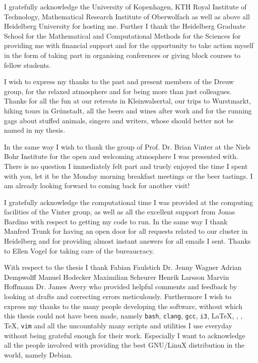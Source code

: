 
I gratefully acknowledge
the University of Kopenhagen,
KTH Royal Institute of Technology,
Mathematical Research Institute of Oberwolfach
as well as above all
Heidelberg University
for hosting me.
Further I thank the Heidelberg Graduate School
for the Mathematical and Computational Methods for the Sciences
for providing me with financial support
and for the opportunity to take action myself
in the form of taking part in organising conferences
or giving block courses to fellow students.

I wish to express my thanks
to the past and present members of the Dreuw group,
for the relaxed atmosphere and for being more than just colleagues.
Thanks for all the fun
at our retreats in Kleinwalsertal, our trips to Wurstmarkt,
hiking tours in Grünstadt,
all the beers and wines after work
and for the running gags about stuffed animals,
singers and writers,
whose should better not be named in my thesis.

In the same way I wish to thank
the group of Prof. Dr. Brian Vinter
at the Niels Bohr Institute
for the open and welcoming atmosphere I was presented with.
There is no question I immediately felt part
and truely enjoyed the time I spent with you,
let it be the Monday morning breakfast meetings
or the beer tastings.
I am already looking forward to coming back for another visit!

I gratefully acknowledge the computational time I was provided
at the computing facilities of the Vinter group,
as well as all the excellent support from Jonas Bardino
with respect to getting my code to run.
In the same way I thank Manfred Trunk
for having an open door for all requests related
to our cluster in Heidelberg
and for providing almost instant answers for all emails I sent.
Thanks to Ellen Vogel for taking care of the bureaucracy.


With respect to the thesis I thank
Fabian Faulstich
Dr. Jenny Wagner
Adrian Dempwolff
Manuel Hodecker
Maximilian Scheurer
Henrik Larsson
Marvin Hoffmann 
Dr. James Avery
who provided helpful comments and feedback
by looking at drafts and correcting errors meticulously.
Furthermore I wish to express my thanks to the many people developing
the software, without which this thesis could not have been made,
namely
\texttt{bash},
\texttt{clang},
\texttt{gcc},
\texttt{i3},
\LaTeX,
\numpy,
\python,
\TeX,
\texttt{vim}
and all the uncountably many scripts and utilities
I use everyday without being grateful enough for their work.
Especially I want to acknowledge all the people
involved with providing the best 
GNU/LinuX distribution in the world,
namely Debian.

